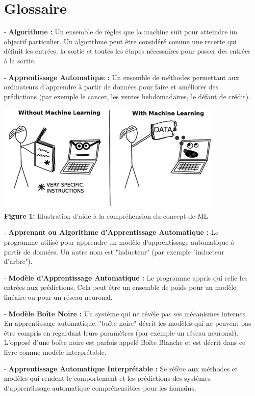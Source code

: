 \section*{Glossaire}


- \textbf{Algorithme :} Un ensemble de règles que la machine suit pour atteindre un objectif particulier. Un algorithme peut être considéré comme une recette qui définit les entrées, la sortie et toutes les étapes nécessaires pour passer des entrées à la sortie.

- \textbf{Apprentissage Automatique :} Un ensemble de méthodes permettant aux ordinateurs d'apprendre à partir de données pour faire et améliorer des prédictions (par exemple le cancer, les ventes hebdomadaires, le défaut de crédit).

\begin{center}
    \includegraphics[width=0.7\linewidth]{Images/ml_illustration.png}
    \\
    \textbf{Figure 1:} Illustration d'aide à la compréhension du concept de ML 
\end{center}

- \textbf{Apprenant ou Algorithme d'Apprentissage Automatique :} Le programme utilisé pour apprendre un modèle d'apprentissage automatique à partir de données. Un autre nom est "inducteur" (par exemple "inducteur d'arbre").

- \textbf{Modèle d'Apprentissage Automatique :} Le programme appris qui relie les entrées aux prédictions. Cela peut être un ensemble de poids pour un modèle linéaire ou pour un réseau neuronal.

- \textbf{Modèle Boîte Noire :} Un système qui ne révèle pas ses mécanismes internes. En apprentissage automatique, "boîte noire" décrit les modèles qui ne peuvent pas être compris en regardant leurs paramètres (par exemple un réseau neuronal). L'opposé d'une boîte noire est parfois appelé Boîte Blanche et est décrit dans ce livre comme modèle interprétable.

- \textbf{Apprentissage Automatique Interprétable :} Se réfère aux méthodes et modèles qui rendent le comportement et les prédictions des systèmes d'apprentissage automatique compréhensibles pour les humains.

